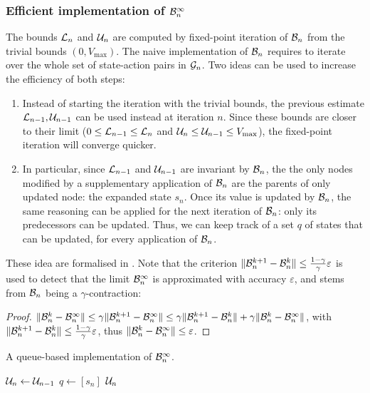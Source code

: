 \begin{subappendices}
\subsubsection{Efficient implementation of $\mathcal{B}_n^\infty$}

The bounds $\mathcal{L}_n$ and $\mathcal{U}_n$ are computed by fixed-point iteration of $\mathcal{B}_n$ from the trivial bounds $(0,V_{\max})$. The naive implementation of $\mathcal{B}_n$ requires to iterate over the whole set of state-action pairs in $\mathcal{G}_n$. 
Two ideas can be used to increase the efficiency of both steps:
\begin{enumerate}[label=(\roman*)]
	\item Instead of starting the iteration with the trivial bounds, the previous estimate $\mathcal{L}_{n-1}, \mathcal{U}_{n-1}$ can be used instead at iteration $n$. Since these bounds are closer to their limit ($0\leq \mathcal{L}_{n-1}\leq \mathcal{L}_n$ and $\mathcal{U}_n\leq \mathcal{U}_{n-1} \leq V_{\max}$), the fixed-point iteration will converge quicker.
	\item In particular, since $\mathcal{L}_{n-1}$ and $\mathcal{U}_{n-1}$ are invariant by $\mathcal{B}_n$, the the only nodes modified by a supplementary application of $\mathcal{B}_n$ are the parents of only updated node: the expanded state $s_n$. Once its value is updated by $\mathcal{B}_n$, the same reasoning can be applied for the next iteration of $\mathcal{B}_n$: only its predecessors can be updated. Thus, we can keep track of a set $q$ of states that can be updated, for every application of $\mathcal{B}_n$.
\end{enumerate}
These idea are formalised in . Note that the criterion $\|\mathcal{B}_n^{k+1} - \mathcal{B}_n^k\| \leq \frac{1-\gamma}{\gamma}\varepsilon$ is used to detect that the limit $\mathcal{B}_n^\infty$ is approximated with accuracy $\varepsilon$, and stems from $\mathcal{B}_n$ being a $\gamma$-contraction:
\begin{proof}
	$\|\mathcal{B}_n^k - \mathcal{B}_n^\infty\| \leq \gamma\| \mathcal{B}_n^{k+1} - \mathcal{B}_n^\infty\| \leq \gamma \|\mathcal{B}_n^{k+1} - \mathcal{B}_n^{k}\| + \gamma \|\mathcal{B}_n^{k} - \mathcal{B}_n^\infty\|$, with $\| \mathcal{B}_n^{k+1} - \mathcal{B}_n^{k}\| \leq \frac{1-\gamma}{\gamma}\varepsilon$, thus $\|\mathcal{B}_n^{k} - \mathcal{B}_n^\infty\| \leq \varepsilon$.
	\end{proof}

\begin{algorithm}
	\caption{A queue-based implementation of $\mathcal{B}_n^\infty$.}
	\label{alg:queue-b-inf}
	\DontPrintSemicolon
	$\mathcal{U}_n \gets \mathcal{U}_{n-1}$\;
	$q\gets [s_n]$\;
	\Return $\mathcal{U}_n$\;
\end{algorithm}



\end{subappendices}

